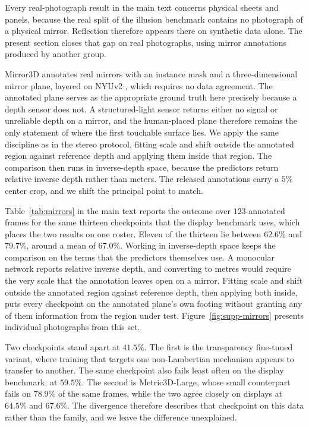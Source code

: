 \documentclass{article} %
\theoremstyle{defstyle}
\theoremstyle{plain}
\begin{document}
Every real-photograph result in the main text concerns physical sheets and panels, because the
real split of the illusion benchmark contains no photograph of a physical mirror. Reflection
therefore appears there on synthetic data alone. The present section closes that gap on real
photographs, using mirror annotations produced by another group.

Mirror3D \citep{mirror3d2021} annotates real mirrors with an instance mask and a
three-dimensional mirror plane, layered on NYUv2 \citep{nyuv22012}, which requires no data
agreement. The annotated plane serves as the appropriate ground truth here precisely because a
depth sensor does not. A structured-light sensor returns either no signal or unreliable depth
on a mirror, and the human-placed plane therefore remains the only statement of where the first
touchable surface lies. We apply the same discipline as in the stereo protocol, fitting scale
and shift outside the annotated region against reference depth and applying them inside that
region. The comparison then runs in inverse-depth space, because the predictors return relative
inverse depth rather than meters. The released annotations carry a $5\%$ center crop, and we
shift the principal point to match.

Table~\ref{tab:mirrors} in the main text reports the outcome over $123$ annotated frames for
the same thirteen checkpoints that the display benchmark uses, which places the two results on
one roster. Eleven of the thirteen lie between $62.6\%$ and $79.7\%$, around a mean of
$67.0\%$. Working in inverse-depth space keeps the comparison on the terms that the predictors
themselves use. A monocular network reports relative inverse depth, and converting to metres
would require the very scale that the annotation leaves open on a mirror. Fitting scale and
shift outside the annotated region against reference depth, then applying both inside, puts
every checkpoint on the annotated plane's own footing without granting any of them information
from the region under test. Figure~\ref{fig:supp-mirrors} presents individual photographs from
this set.

Two checkpoints stand apart at $41.5\%$. The first is the
transparency fine-tuned variant, where training that targets one non-Lambertian mechanism
appears to transfer to another. The same checkpoint also fails least often on the display
benchmark, at $59.5\%$. The second is Metric3D-Large, whose small counterpart fails on $78.9\%$
of the same frames, while the two agree closely on displays at $64.5\%$ and $67.6\%$. The
divergence therefore describes that checkpoint on this data rather than the family, and we
leave the difference unexplained.
\end{document}
